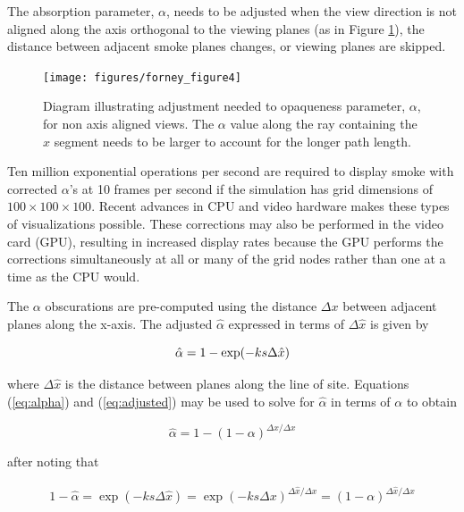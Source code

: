 The absorption parameter, $\alpha$, needs to be adjusted when the view direction is not aligned along the axis orthogonal to the viewing planes (as in Figure \ref{figray}), the distance between adjacent smoke planes changes, or viewing planes are skipped.

\begin{figure}[\figoptions]
\centerline{\texttt{[image: figures/forney\_figure4]}}
\caption [Diagram illustrating the adjustment needed to opaqueness
parameter, $\alpha$, for non axis aligned views.] { Diagram
illustrating adjustment needed to opaqueness parameter, $\alpha$,
for non axis aligned views. The $\alpha$ value along the ray
containing the $\hat{x}$ segment needs to be larger to account for
the longer path length. } \label{figray}
\end{figure}

Ten million exponential operations per second are required to display smoke with corrected $\alpha$'s at 10 frames per second if the simulation has grid dimensions of $100\times 100\times 100$. Recent advances in CPU and video hardware makes these types of visualizations possible. These corrections may also be performed in the video card (GPU), resulting in increased display rates because the GPU performs the corrections simultaneously at all or many of the grid nodes rather than one at a time as the CPU would.

The $\alpha$ obscurations are pre-computed using the distance $\Delta x$ between adjacent planes along the x-axis. The adjusted $\hat{\alpha}$ expressed in terms of $\Delta\hat{x}$ is given by

\begin{equation}
\label{eq:adjusted}
\hat{\alpha}=1-\exp(-ks\Delta \hat{x})\\
\end{equation}

where $\Delta\hat{x}$ is the distance between planes along the line of site.  Equations (\ref{eq:alpha}) and (\ref{eq:adjusted}) may be used to solve for $\hat{\alpha}$ in terms of $\alpha$ to obtain

\begin{equation}
\label{eq:alphahat}
\hat{\alpha}=1-(1-\alpha)^{\Delta\hat{x}/\Delta x}
\end{equation}

after noting that

\begin{eqnarray*}
1-\hat{\alpha}=\exp(-ks\Delta\hat{x})=\exp(-ks\Delta
x)^{\Delta\hat{x}/\Delta x}=(1-\alpha)^{\Delta\hat{x}/\Delta x}
\end{eqnarray*}

